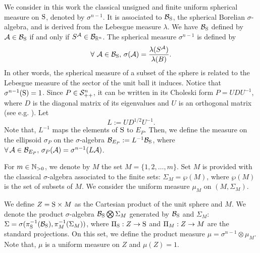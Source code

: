We consider in this work the classical unsigned and finite uniform spherical measure on $\text{S}$, denoted by $\sigma^{n-1}$. It is associated to $\mathcal{B}_{\text{S}}$, the spherical Borelian $\sigma$-algebra, and is derived from the Lebesgue measure $\lambda$. We have $\mathcal{B}_{\text{S}}$ defined by $\mathcal{A} \in \mathcal{B}_{\text{S}}$ if and only if $S^{\mathcal{A}} \in \mathcal{B}_{\mathbb{R}^n}$. The spherical measure $\sigma^{n-1}$ is defined by
$$\forall\ \mathcal{A} \in \mathcal{B}_{\text{S}},\, \sigma(\mathcal{A}) = \frac{\lambda(S^{\mathcal{A}})}{\lambda(B)}. $$
In other words, the spherical measure of a subset of the sphere is related to the Lebesgue measure of the sector of the unit ball it induces. Notice that $\sigma^{n-1}(\text{S}) = 1$.
Since $P \in \mathcal{S}_{++}^n$, it can be written in its Choleski form $P = UDU^{-1}$, where $D$ is the diagonal matrix of its eigenvalues and $U$ is an orthogonal matrix (see e.g. \cite{boyd}). Let \begin{equation}\label{choleski}L:=UD^{1/2}U^{-1}.\end{equation} Note that, $L^{-1}$ maps the elements of $\text{S}$ to $E_P$. Then, we define the measure on the ellipsoid $\sigma_P$ on the $\sigma$-algebra $\mathcal{B}_{E_P}:=L^{-1}\mathcal{B}_{\text{S}}$, where $\forall\, \mathcal{A} \in \mathcal{B}_{E_P},\, \sigma_P({\mathcal{A}}) = \sigma^{n-1}(L\mathcal{A})$. 

%
%
%


For $m \in \mathbb{N}_{>0}$, we denote by $M$ the set $M=\{1,2, \ldots,m \}$. Set $M$ is provided with the classical $\sigma$-algebra associated to the finite sets: $\Sigma_M = \wp(M)$, where $\wp(M)$ is the set of subsets of $M$. We consider the uniform measure $\mu_M$ on $(M, \Sigma_M)$. 

We define $Z = \text{S} \times M$ as the Cartesian product of the unit sphere and $M$. We denote the product $\sigma$-algebra $\mathcal{B}_{\text{S}} \bigotimes \Sigma_M$ generated by $\mathcal{B}_{\text{S}}$ and $\Sigma_M$: $\Sigma = \sigma( \pi_{\text{S}}^{-1}(\mathcal{B}_{\text{S}}),  \pi_{M}^{-1}(\Sigma_M))$, where $\Pi_{\text{S}}:Z \to \text{S}$ and $\Pi_M: Z \to M$ are the standard projections. On this set, we define the product measure $\mu = \sigma^{n-1} \otimes \mu_M$. Note that, $\mu$ is a uniform measure on $Z$ and $\mu(Z)=1$.  